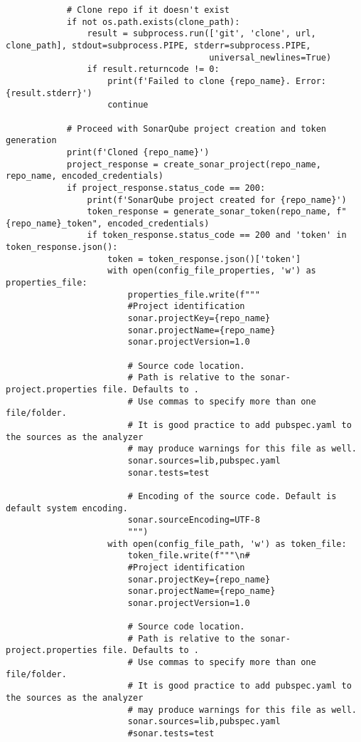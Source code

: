 \begin{lstlisting}
            # Clone repo if it doesn't exist
            if not os.path.exists(clone_path):
                result = subprocess.run(['git', 'clone', url, clone_path], stdout=subprocess.PIPE, stderr=subprocess.PIPE,
                                        universal_newlines=True)
                if result.returncode != 0:
                    print(f'Failed to clone {repo_name}. Error: {result.stderr}')
                    continue
    
            # Proceed with SonarQube project creation and token generation
            print(f'Cloned {repo_name}')
            project_response = create_sonar_project(repo_name, repo_name, encoded_credentials)
            if project_response.status_code == 200:
                print(f'SonarQube project created for {repo_name}')
                token_response = generate_sonar_token(repo_name, f"{repo_name}_token", encoded_credentials)
                if token_response.status_code == 200 and 'token' in token_response.json():
                    token = token_response.json()['token']
                    with open(config_file_properties, 'w') as properties_file:
                        properties_file.write(f"""
                        #Project identification
                        sonar.projectKey={repo_name}
                        sonar.projectName={repo_name}
                        sonar.projectVersion=1.0
                        
                        # Source code location.
                        # Path is relative to the sonar-project.properties file. Defaults to .
                        # Use commas to specify more than one file/folder.
                        # It is good practice to add pubspec.yaml to the sources as the analyzer
                        # may produce warnings for this file as well.
                        sonar.sources=lib,pubspec.yaml
                        sonar.tests=test
                        
                        # Encoding of the source code. Default is default system encoding.
                        sonar.sourceEncoding=UTF-8
                        """)
                    with open(config_file_path, 'w') as token_file:
                        token_file.write(f"""\n# 
                        #Project identification
                        sonar.projectKey={repo_name}
                        sonar.projectName={repo_name}
                        sonar.projectVersion=1.0
                        
                        # Source code location.
                        # Path is relative to the sonar-project.properties file. Defaults to .
                        # Use commas to specify more than one file/folder.
                        # It is good practice to add pubspec.yaml to the sources as the analyzer
                        # may produce warnings for this file as well.
                        sonar.sources=lib,pubspec.yaml
                        #sonar.tests=test
                        

\end{lstlisting}
